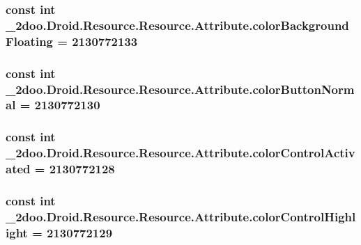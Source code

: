 \hypertarget{class__2doo_1_1_droid_1_1_resource_1_1_attribute_80aadbbb36f4a40e8b7be0fd9c118741}{
\subsubsection[{colorBackgroundFloating}]{\setlength{\rightskip}{0pt plus 5cm}const int \_\-2doo.Droid.Resource.Resource.Attribute.colorBackgroundFloating = 2130772133}}
\label{class__2doo_1_1_droid_1_1_resource_1_1_attribute_80aadbbb36f4a40e8b7be0fd9c118741}


\hypertarget{class__2doo_1_1_droid_1_1_resource_1_1_attribute_c68076063ba4944927fbc3923174c1e5}{
\subsubsection[{colorButtonNormal}]{\setlength{\rightskip}{0pt plus 5cm}const int \_\-2doo.Droid.Resource.Resource.Attribute.colorButtonNormal = 2130772130}}
\label{class__2doo_1_1_droid_1_1_resource_1_1_attribute_c68076063ba4944927fbc3923174c1e5}


\hypertarget{class__2doo_1_1_droid_1_1_resource_1_1_attribute_428d1a3e9b0170b449dfc7d51d142658}{
\subsubsection[{colorControlActivated}]{\setlength{\rightskip}{0pt plus 5cm}const int \_\-2doo.Droid.Resource.Resource.Attribute.colorControlActivated = 2130772128}}
\label{class__2doo_1_1_droid_1_1_resource_1_1_attribute_428d1a3e9b0170b449dfc7d51d142658}


\hypertarget{class__2doo_1_1_droid_1_1_resource_1_1_attribute_e1f99f06a20b4b5a1297c7ad25a42171}{
\subsubsection[{colorControlHighlight}]{\setlength{\rightskip}{0pt plus 5cm}const int \_\-2doo.Droid.Resource.Resource.Attribute.colorControlHighlight = 2130772129}}
\label{class__2doo_1_1_droid_1_1_resource_1_1_attribute_e1f99f06a20b4b5a1297c7ad25a42171}


